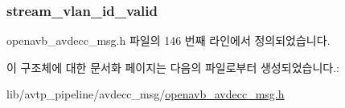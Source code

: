 \subsubsection[{\texorpdfstring{stream\+\_\+vlan\+\_\+id\+\_\+valid}{stream_vlan_id_valid}}]{ stream\+\_\+vlan\+\_\+id\+\_\+valid}\hypertarget{structopenavb_avdecc_msg_params___s2_c___talker_stream_i_d__t_ac60cc4128b8b7d706dd7de98f1da5bd1}{}\label{structopenavb_avdecc_msg_params___s2_c___talker_stream_i_d__t_ac60cc4128b8b7d706dd7de98f1da5bd1}


openavb\+\_\+avdecc\+\_\+msg.\+h 파일의 146 번째 라인에서 정의되었습니다.



이 구조체에 대한 문서화 페이지는 다음의 파일로부터 생성되었습니다.\+:\begin{DoxyCompactItemize}
\item 
lib/avtp\+\_\+pipeline/avdecc\+\_\+msg/\hyperlink{openavb__avdecc__msg_8h}{openavb\+\_\+avdecc\+\_\+msg.\+h}\end{DoxyCompactItemize}
